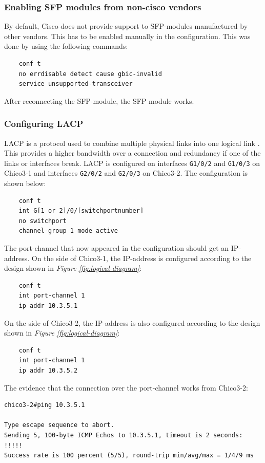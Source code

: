 \documentclass[10pt,a4paper]{article}
\begin{document}
\subsubsection{Enabling SFP modules from non-cisco vendors}
By default, Cisco does not provide support to SFP-modules manufactured by other vendors. This has to be enabled manually in the configuration. This was done by using the following commands:
\begin{verbatim}
    conf t
    no errdisable detect cause gbic-invalid
    service unsupported-transceiver
\end{verbatim}
After reconnecting the SFP-module, the SFP module works.

\subsubsection{Configuring LACP}
LACP is a protocol used to combine multiple physical links into one logical link \cite{ciscolacp}. This provides a higher bandwidth over a connection and redundancy if one of the links or interfaces break. LACP is configured on interfaces \texttt{G1/0/2} and \texttt{G1/0/3} on Chico3-1 and interfaces \texttt{G2/0/2} and \texttt{G2/0/3} on Chico3-2. The configuration is shown below:

\begin{verbatim}
    conf t
    int G[1 or 2]/0/[switchportnumber]
    no switchport
    channel-group 1 mode active
\end{verbatim}

The port-channel that now appeared in the configuration should get an IP-address. On the side of Chico3-1, the IP-address is configured according to the design shown in \textit{Figure \ref{fig:logical-diagram}}:

\begin{verbatim}
    conf t
    int port-channel 1
    ip addr 10.3.5.1
\end{verbatim}

On the side of Chico3-2, the IP-address is also configured according to the design shown in \textit{Figure \ref{fig:logical-diagram}}:

\begin{verbatim}
    conf t
    int port-channel 1
    ip addr 10.3.5.2
\end{verbatim}

The evidence that the connection over the port-channel works from Chico3-2:
\begin{verbatim}
chico3-2#ping 10.3.5.1

Type escape sequence to abort.
Sending 5, 100-byte ICMP Echos to 10.3.5.1, timeout is 2 seconds:
!!!!!
Success rate is 100 percent (5/5), round-trip min/avg/max = 1/4/9 ms
\end{verbatim}
\\
\end{document}
